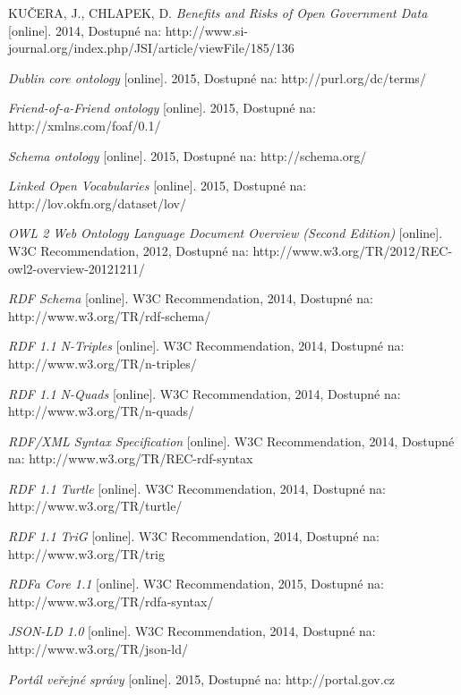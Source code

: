 \begin{thebibliography}{99}
  KUČERA, J., CHLAPEK, D.
  \emph{Benefits and Risks of Open Government Data} 
  [online]. 2014, Dostupné na: 
  http://www.si-journal.org/index.php/JSI/article/viewFile/185/136 
  
  \emph{Dublin core ontology} 
  [online]. 2015, Dostupné na: 
  http://purl.org/dc/terms/
  
  \emph{Friend-of-a-Friend ontology} 
  [online]. 2015, Dostupné na: 
  http://xmlns.com/foaf/0.1/
  
  \emph{Schema ontology} 
  [online]. 2015, Dostupné na: 
  http://schema.org/  
  
  \emph{Linked Open Vocabularies } 
  [online]. 2015, Dostupné na: 
  http://lov.okfn.org/dataset/lov/
  
  \emph{OWL 2 Web Ontology Language Document Overview (Second Edition)} 
  [online]. W3C Recommendation, 2012, Dostupné na: 
  http://www.w3.org/TR/2012/REC-owl2-overview-20121211/ 
  
  \emph{RDF Schema} 
  [online]. W3C Recommendation, 2014, Dostupné na: 
  http://www.w3.org/TR/rdf-schema/   
  
  \emph{RDF 1.1 N-Triples} 
  [online]. W3C Recommendation, 2014, Dostupné na: 
  http://www.w3.org/TR/n-triples/ 
  
  \emph{RDF 1.1 N-Quads} 
  [online]. W3C Recommendation, 2014, Dostupné na: 
  http://www.w3.org/TR/n-quads/ 

  \emph{RDF/XML Syntax Specification} 
  [online]. W3C Recommendation, 2014, Dostupné na: 
  http://www.w3.org/TR/REC-rdf-syntax 
  
  \emph{RDF 1.1 Turtle} 
  [online]. W3C Recommendation, 2014, Dostupné na: 
  http://www.w3.org/TR/turtle/

  \emph{RDF 1.1 TriG} 
  [online]. W3C Recommendation, 2014, Dostupné na: 
  http://www.w3.org/TR/trig
  
  \emph{RDFa Core 1.1} 
  [online]. W3C Recommendation, 2015, Dostupné na: 
  http://www.w3.org/TR/rdfa-syntax/
  
  \emph{JSON-LD 1.0} 
  [online]. W3C Recommendation, 2014, Dostupné na: 
  http://www.w3.org/TR/json-ld/

  \emph{Portál veřejné správy} 
  [online]. 2015, Dostupné na: 
  http://portal.gov.cz  
    

\end{thebibliography}
